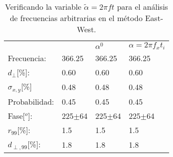 \begin{table}[H]
    \begin{small}
        \begin{center}
            \begin{tabular}[c]{l|l|l|l}
                                    & \cite{Aab_2020} & $\alpha^0$   & $\alpha=2\pi f_xt_i$   \\ 
                Frecuencia:         & 366.25          &  366.25      &  366.25            \\
                $d_\perp$[\%]:      & 0.60            &  0.60        &  0.60              \\
                $\sigma_{x,y}$[\%]  & 0.48            &  0.48        &  0.48              \\ 
                Probabilidad:       & 0.45            &  0.45        &  0.45              \\
                Fase[$^o$]:         & 225$\pm$64      &  225$\pm$64  &  225$\pm$64          \\
                $r_{99}$[\%]:       & 1.5             &  1.5         &  1.5             \\
                $d_{\perp,99}$[\%]: & 1.8             &  1.8         &  1.8             \\
            \end{tabular}
        \end{center}
        \caption{Verificando la  variable $\tilde{\alpha}=2\pi ft$ para el análisis de frecuencias arbitrarias en el método East-West.}
        \label{tab:comp_vars}
    \end{small}
\end{table}

